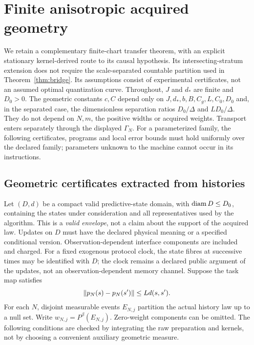 \section{Finite anisotropic acquired geometry}\label{sec:main}
We retain a complementary finite-chart transfer theorem, with an explicit stationary kernel-derived route to its causal hypothesis. Its intersecting-stratum extension does not require the scale-separated countable partition used in Theorem~\ref{thm:bridge}. Its assumptions consist of experimental certificates, not an assumed optimal quantization curve. Throughout, $J$ and $d_*$ are finite and $D_0>0$. The geometric constants $c,C$ depend only on $J,d_*,b,B,C_g,L,C_0,D_0$ and, in the separated case, the dimensionless separation ratios $D_0/\Delta$ and $LD_0/\Delta$. They do not depend on $N,m$, the positive widths or acquired weights. Transport enters separately through the displayed $\Gamma_N$. For a parameterized family, the following certificates, programs and local error bounds must hold uniformly over the declared family; parameters unknown to the machine cannot occur in its instructions.

\subsection{Geometric certificates extracted from histories}
Let $(D,d)$ be a compact valid predictive-state domain, with $\operatorname{diam} D\le D_0$, containing the states under consideration and all representatives used by the algorithm. This is a \emph{valid envelope}, not a claim about the support of the acquired law. Updates on $D$ must have the declared physical meaning or a specified conditional version. Observation-dependent interface components are included and charged. For a fixed exogenous protocol clock, the state fibres at successive times may be identified with $D$; the clock remains a declared public argument of the updates, not an observation-dependent memory channel. Suppose the task map satisfies
\begin{equation}\label{eq:task-lip}
 \lVert p_N(s)-p_N(s')\rVert\le Ld(s,s').
\end{equation}
For each $N$, disjoint measurable events $E_{N,j}$ partition the actual history law up to a null set. Write $w_{N,j}=P^\beta(E_{N,j})$. Zero-weight components can be omitted. The following conditions are checked by integrating the raw preparation and kernels, not by choosing a convenient auxiliary geometric measure.

